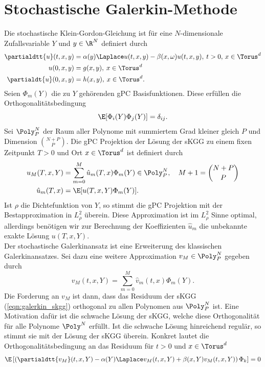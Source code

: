 
\chapter{Stochastische Galerkin-Methode}
\label{Chapter5}
Die stochastische Klein-Gordon-Gleichung ist für eine $N$-dimensionale Zufallsvariable $Y$ und $y\in\R^N$ definiert durch
\begin{align}
\label{eqn:galerkin_skgg}
\partialdtt{u}(t,x,y)&=\alpha(y) \Laplace u(t,x,y) - \beta(x,\omega)u(t,x,y), \: t>0, \, x\in \Torus^d\\
u(0,x,y)&=g(x,y), \: x\in \Torus^d\nonumber\\
\partialdt{u}(0,x,y)&=h(x,y), \: x\in \Torus^d.\nonumber
\end{align}
Seien $\Phi_m(Y)$ die zu $Y$ gehörenden gPC Basisfunktionen. Diese erfüllen die Orthogonalitätsbedingung 
\[\E[\Phi_i(Y)\Phi_j(Y)]=\delta_{ij}.\] 
Sei $\Poly_P^N$ der Raum aller Polynome mit summiertem Grad kleiner gleich $P$ und Dimension $\binom{N+P}{P}$. Die gPC Projektion der Lösung der sKGG zu einem fixen Zeitpunkt $T>0$ und Ort $x\in\Torus^d$ ist definiert durch
\begin{align*}
u_M(T,x,Y)&=\sum_{m=0}^M\hat{u}_m(T,x)\Phi_m(Y)\in\Poly_P^N,\quad  M+1=\binom{N+P}{P}\\
\hat{u}_m(T,x)&=\E[u(T,x,Y)\Phi_m(Y)].
\end{align*}
Ist $\rho$ die Dichtefunktion von $Y$, so stimmt die gPC Projektion mit der Bestapproximation in $L_\rho^2$ überein. Diese Approximation ist im $L_\rho^2$ Sinne optimal, allerdings benötigen wir zur Berechnung der Koeffizienten $\hat{u}_m$ die unbekannte exakte Lösung $u(T,x,Y)$.\\
Der stochastische Galerkinansatz ist eine Erweiterung des klassischen Galerkinansatzes. Sei dazu eine weitere Approximation $v_M\in\Poly_P^N$ gegeben durch
\begin{equation}
v_M(t,x,Y)=\sum_{m=0}^M\hat{v}_m(t,x)\Phi_m(Y).
\end{equation}
Die Forderung an $v_M$ ist dann, dass das Residuum der sKGG (\ref{eqn:galerkin_skgg}) orthogonal zu allen Polynomen aus $\Poly_P^N$ ist. Eine Motivation dafür ist die schwache Lösung der sKGG, welche diese Orthogonalität für alle Polynome $\Poly^N$ erfüllt. Ist die schwache Lösung hinreichend regulär, so stimmt sie mit der Lösung der sKGG überein.
Konkret lautet die Orthogonalitätsbedingung an das Residuum für $t>0$ und $x\in\Torus^d$
\begin{equation}
\label{eqn:galerkinOrtho}
\E\left[\left(\partialdtt{v_M}(t,x,Y)-\alpha(Y)\Laplace v_M(t,x,Y)+\beta(x,Y)v_M(t,x,Y)\right)\Phi_k\right]=0
\end{equation} 
